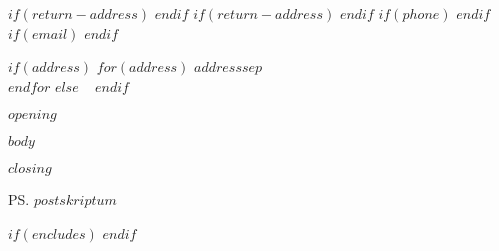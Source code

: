 \documentclass[
    foldmarks=true,      %
    foldmarks=BTm,       %
    $if(return-address)$
    fromalign=right,     %
    $else$
    fromalign=false,
    $endif$
    $if(phone)$
    fromphone,           %
    $endif$
    $if(email)$
    fromemail,           %
    $endif$
    fromlogo,            %
    version=last,        %
    firstfoot=false,     %
    enlargefirstpage
]{scrlttr2}
\begin{document}
    $if(return-address)$
    $endif$
    $if(return-address)$
    $endif$
    $if(phone)$
    $endif$
    $if(email)$
    $endif$



    \begin{letter}{%
        $if(address)$
            $for(address)$
                $address$$sep$\\
            $endfor$
        $else$
        ~
        $endif$
    }
        \opening{$opening$}

        $body$

        \closing{$closing$}

        \ps $postskriptum$

        $if(encludes)$
        $endif$
    \end{letter}
\end{document}
